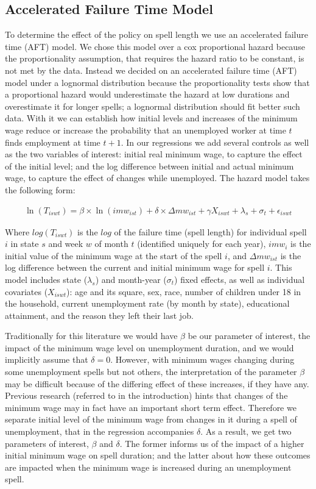\documentclass{article}
\begin{document}
\subsection{Accelerated Failure Time Model}

To determine the effect of the policy on spell length we use an accelerated failure time (AFT) model. We chose this model over a cox proportional hazard because the proportionality assumption, that requires the hazard ratio to be constant, is not met by the data. Instead we decided on an accelerated failure time (AFT) model under a lognormal distribution because the proportionality tests show that a proportional hazard would underestimate the hazard at low durations and overestimate it for longer spells; a lognormal distribution should fit better such data. With it we can establish how initial levels and increases of the minimum wage reduce or increase the probability that an unemployed worker at time $t$ finds employment at time $t+1$. In our regressions we add several controls as well as the two variables of interest: initial  real minimum wage, to capture the effect of the initial level; and the log difference between initial and actual minimum wage, to capture the effect of changes while unemployed. The hazard model takes the following form:

\begin{align}
\ln{(T_{iswt})}=\beta\times \ln{(imw_{ist})}+ \delta\times \Delta mw_{ist}+ \gamma X_{iswt} + \lambda_s+\sigma_t + \epsilon_{iswt}
\end{align}

Where $log(T_{iswt})$ is the $log$ of the failure time (spell length) for individual spell $i$ in state $s$ and week $w$ of month $t$ (identified uniquely for each year), $imw_{i}$ is the initial value of the minimum wage at the start of the spell $i$, and $\Delta mw_{ist}$ is the log difference between the current and initial minimum wage for spell $i$. This model includes state ($\lambda_s$) and month-year ($\sigma_t$) fixed effects, as well as individual covariates ($X_{iswt}$): age and its square, sex, race, number of children under 18 in the household, current unemployment rate (by month by state), educational attainment, and the reason they left their last job.

Traditionally for this literature we would have $\beta$ be our parameter of interest, the impact of the minimum wage level on unemployment duration, and we would implicitly assume that $\delta=0$. However, with minimum wages changing during some unemployment spells but not others, the interpretation of the parameter $\beta$ may be difficult because of the differing effect of these increases, if they have any. Previous research (referred to in the introduction) hints that changes of the minimum wage may in fact have an important short term effect. Therefore we separate initial level of the minimum wage from changes in it during a spell of unemployment, that in the regression accompanies $\delta$. As a result, we get two parameters of interest, $\beta$ and $\delta$. The former informs us of the impact of a higher initial minimum wage on spell duration; and the latter about how these outcomes are impacted when the minimum wage is increased during an unemployment spell.
\end{document}
